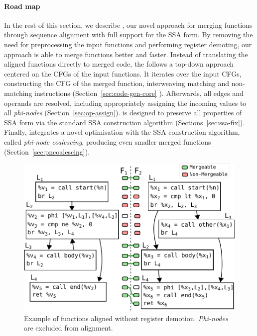 \paragraph*{Road map} In the rest of this section, we describe {\ProjName}, our novel approach for merging functions through sequence alignment with full
support for the SSA form. By removing the need for preprocessing the input functions and performing register demoting, our approach is able
to merge functions better and faster. Instead of translating the aligned functions directly to merged code, the {\ProjName} follows a
top-down approach centered on the CFGs of the input functions. It iterates over the input CFGs, constructing the
CFG of the merged function, interweaving matching and non-matching instructions (Section~\ref{sec:code-gen-core}
). Afterwards, all edges and operands are resolved, including appropriately assigning the incoming values to all \textit{phi-nodes} (Section~\ref{sec:op-assign}).
{\ProjName} is designed to preserve all properties of SSA form via the standard SSA construction algorithm (Sections~\ref{sec:ssa-fix}).
Finally, {\ProjName} integrates a novel optimisation with the SSA construction algorithm, called \textit{phi-node coalescing}, producing even smaller merged functions (Section~\ref{sec:pncoalescing}).

\begin{figure}[t!]
  \centering
  \includegraphics[scale=0.55]{src/merge-operation/figs/code-gen-cfg-input.pdf}
    \caption{Example of functions aligned without register demotion.
    \textit{Phi-nodes} are excluded from alignment.}
  \label{fig:code-gen-cfg-input}
\end{figure}

